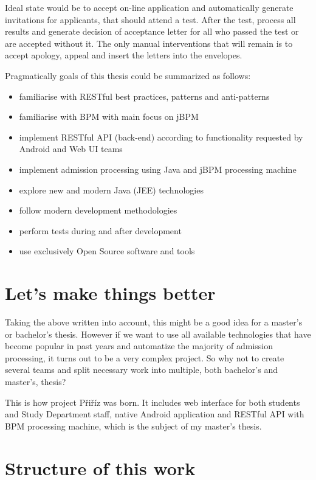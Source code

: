 \begin{introduction}
	Ideal state would be to accept on-line application and automatically generate invitations for applicants, that should
	attend a test. After the test, process all results and generate decision of acceptance letter for all who passed the
	test or are accepted without it. The only manual interventions that will remain is to accept apology, appeal and insert
	the letters into the envelopes.

	Pragmatically goals of this thesis could be summarized as follows:
	
	\begin{itemize}
	  \item familiarise with RESTful best practices, patterns and anti-patterns
	  \item familiarise with \gls{BPM} with main focus on jBPM
	  \item implement RESTful \gls{API} (back-end) according to functionality requested by Android and Web UI teams
	  \item implement admission processing using Java and jBPM processing machine
	  \item explore new and modern Java (JEE) technologies
	  \item follow modern development methodologies
	  \item perform tests during and after development
	  \item use exclusively Open Source software and tools
	\end{itemize}
	
	\section{Let's make things better}
	
	Taking the above written into account, this might be a good idea for a master's or bachelor's thesis. However if we
	want to use all available technologies that have become popular in past years and automatize the majority of admission
	processing, it turns out to be a very complex project. So why not to create several teams and split necessary work into
	multiple, both bachelor's and master's, thesis?
	
	This is how project Přiříz was born. It includes web interface for both students and Study Department staff, native
	Android application and RESTful \gls{API} with \gls{BPM} processing machine, which is the subject of my master's thesis.
	
	\section{Structure of this work}
	

\end{introduction}

